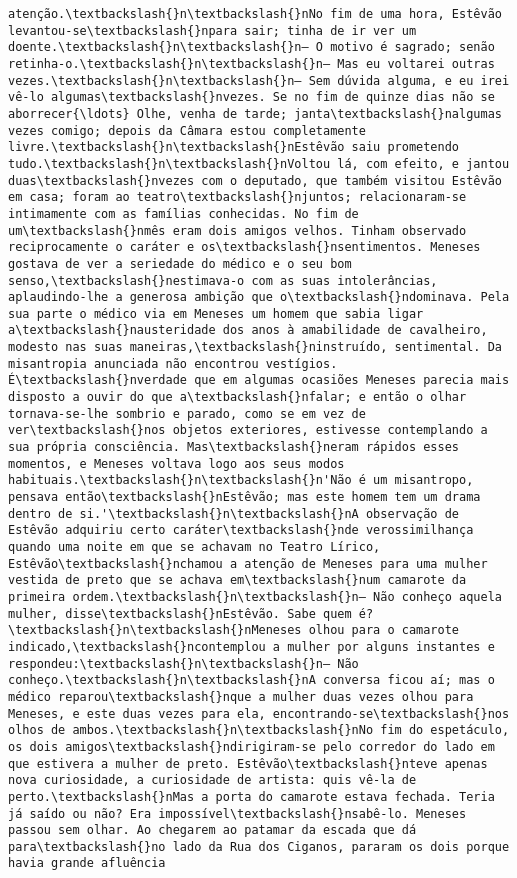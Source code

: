 \begin{Verbatim}[commandchars=\\\{\}]
atenção.\textbackslash{}n\textbackslash{}nNo fim de uma hora, Estêvão levantou-se\textbackslash{}npara sair; tinha de ir ver um doente.\textbackslash{}n\textbackslash{}n— O motivo é sagrado; senão retinha-o.\textbackslash{}n\textbackslash{}n— Mas eu voltarei outras vezes.\textbackslash{}n\textbackslash{}n— Sem dúvida alguma, e eu irei vê-lo algumas\textbackslash{}nvezes. Se no fim de quinze dias não se aborrecer{\ldots} Olhe, venha de tarde; janta\textbackslash{}nalgumas vezes comigo; depois da Câmara estou completamente livre.\textbackslash{}n\textbackslash{}nEstêvão saiu prometendo tudo.\textbackslash{}n\textbackslash{}nVoltou lá, com efeito, e jantou duas\textbackslash{}nvezes com o deputado, que também visitou Estêvão em casa; foram ao teatro\textbackslash{}njuntos; relacionaram-se intimamente com as famílias conhecidas. No fim de um\textbackslash{}nmês eram dois amigos velhos. Tinham observado reciprocamente o caráter e os\textbackslash{}nsentimentos. Meneses gostava de ver a seriedade do médico e o seu bom senso,\textbackslash{}nestimava-o com as suas intolerâncias, aplaudindo-lhe a generosa ambição que o\textbackslash{}ndominava. Pela sua parte o médico via em Meneses um homem que sabia ligar a\textbackslash{}nausteridade dos anos à amabilidade de cavalheiro, modesto nas suas maneiras,\textbackslash{}ninstruído, sentimental. Da misantropia anunciada não encontrou vestígios. É\textbackslash{}nverdade que em algumas ocasiões Meneses parecia mais disposto a ouvir do que a\textbackslash{}nfalar; e então o olhar tornava-se-lhe sombrio e parado, como se em vez de ver\textbackslash{}nos objetos exteriores, estivesse contemplando a sua própria consciência. Mas\textbackslash{}neram rápidos esses momentos, e Meneses voltava logo aos seus modos habituais.\textbackslash{}n\textbackslash{}n'Não é um misantropo, pensava então\textbackslash{}nEstêvão; mas este homem tem um drama dentro de si.'\textbackslash{}n\textbackslash{}nA observação de Estêvão adquiriu certo caráter\textbackslash{}nde verossimilhança quando uma noite em que se achavam no Teatro Lírico, Estêvão\textbackslash{}nchamou a atenção de Meneses para uma mulher vestida de preto que se achava em\textbackslash{}num camarote da primeira ordem.\textbackslash{}n\textbackslash{}n— Não conheço aquela mulher, disse\textbackslash{}nEstêvão. Sabe quem é?\textbackslash{}n\textbackslash{}nMeneses olhou para o camarote indicado,\textbackslash{}ncontemplou a mulher por alguns instantes e respondeu:\textbackslash{}n\textbackslash{}n— Não conheço.\textbackslash{}n\textbackslash{}nA conversa ficou aí; mas o médico reparou\textbackslash{}nque a mulher duas vezes olhou para Meneses, e este duas vezes para ela, encontrando-se\textbackslash{}nos olhos de ambos.\textbackslash{}n\textbackslash{}nNo fim do espetáculo, os dois amigos\textbackslash{}ndirigiram-se pelo corredor do lado em que estivera a mulher de preto. Estêvão\textbackslash{}nteve apenas nova curiosidade, a curiosidade de artista: quis vê-la de perto.\textbackslash{}nMas a porta do camarote estava fechada. Teria já saído ou não? Era impossível\textbackslash{}nsabê-lo. Meneses passou sem olhar. Ao chegarem ao patamar da escada que dá para\textbackslash{}no lado da Rua dos Ciganos, pararam os dois porque havia grande afluência 
\end{Verbatim}
